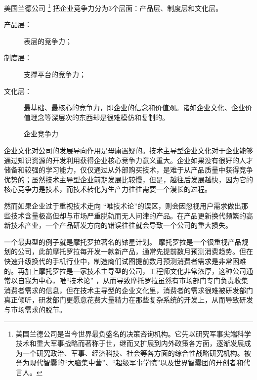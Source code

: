\documentclass{ctexart}
\begin{document}
美国兰德公司 \footnote{ 美国兰德公司\href{https://www.rand.org/}{\faLink}是当今世界最负盛名的决策咨询机构。它先以研究军事尖端科学技术和重大军事战略而著称于世，继而又扩展到内外政策各方面，逐渐发展成为一个研究政治、军事、经济科技、社会等各方面的综合性战略研究机构。被誉为现代智囊的“大脑集中营”、“超级军事学院”以及世界智囊团的开创者和代言人。} 把企业竞争力分为3个层面：产品层、制度层和文化层。

\begin{description}
	\item[产品层：]表层的竞争力；
	\item[制度层：]支撑平台的竞争力；
	\item[文化层：]最基础、最核心的竞争力，即企业的信念和价值观。诸如企业文化、企业价值理念等深层次的东西却是很难模仿和复制的。
\end{description}

\begin{figure}[htpb]
	\centering
	\caption{企业竞争力}
	\label{fig:企业竞争力}
\end{figure}

企业文化对公司的发展导向作用是毋庸置疑的。技术主导型企业文化对于企业能够通过知识资源的开发利用获得企业核心竞争力意义重大。企业如果没有很好的人才储备和较强的学习能力，仅仅通过从外部购买技术，是难于从产品质量中获得竞争优势的；虽然技术主导型企业前期发展比较慢，但是，越往后发展越快，因为它的核心竞争力是技术，而技术转化为生产力往往需要一个漫长的过程。

然而如果企业过于重视技术走向 \enquote{唯技术论}的误区，则会因忽视用户需求做出那些技术含量极高但却与市场严重脱轨而无人问津的产品。在产品更新换代频繁的高新技术产业，一个产品研发方向的错误往往就会导致一个公司的重大损失。

一个最典型的例子就是摩托罗拉著名的铱星计划。 \cite{吴定祥2015中国联想并购摩托罗拉案例分析} 摩托罗拉是一个很重视产品规划的公司，此前摩托罗拉每开发一款新产品，通常先提前数月预测消费趋势。但在快速升级换代的手机行业中，制造商们试图提前数月预测消费者需求是非常困难的。再加上摩托罗拉是一家技术主导型的公司，工程师文化非常浓厚，这种公司通常以自我为中心，唯“技术论” ，从而导致摩托罗拉虽然有市场部门专门负责收集消费者需求的信息，但在技术主导型的企业文化里，消费者的需求很难被研发部门真正倾听，研发部门更愿意花费大量精力在那些复杂系统的开发上，从而导致研发与市场需求的脱节。
\end{document}
